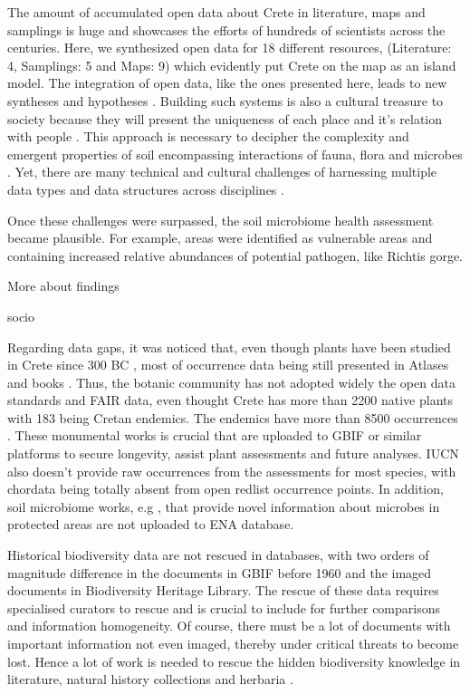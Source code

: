 \documentclass[a4paper,12pt]{article}
\begin{document}
The amount of accumulated open data about Crete in literature, maps and samplings is huge
and showcases the efforts of hundreds of scientists across the centuries.
Here, we synthesized open data for 18 different resources, (Literature: 4, Samplings: 5 and Maps: 9) 
which evidently put Crete on the map as an island model.
The integration of open data,
like the ones presented here, leads to new syntheses and hypotheses \parencite{ramirez2015toward,heberling_j_mason_data_2021}. 
Building such systems is also a cultural treasure to society because
they will present the uniqueness of each place and it's relation with 
people \parencite{bennett2022social}.
This approach is necessary to decipher the complexity and emergent properties of soil \parencite{jorna2024the-underground,philippot2024the-interplay}
encompassing interactions of fauna, flora and microbes \parencite{Fry2019, Crowther2019,GRANDY201640,Delgado-Baquerizo2020}.
Yet, there are many technical and cultural challenges of harnessing multiple data types and data structures across disciplines \parencite{Enquist_2024}.

Once these challenges were surpassed, the soil microbiome health assessment became plausible.
For example, areas were identified as vulnerable areas and containing increased relative
abundances of potential pathogen, like Richtis gorge.

More about findings


socio \parencite{nikolaidis2025an-integrated}

Regarding data gaps, it was noticed that, even though plants have been studied in
Crete since 300 BC \parencite{Krimbas_2005},
most of occurrence data being still presented in Atlases and books \parencite{dimopoulos2016,strid2024atlas,ralph1993flora}.
Thus, the botanic community has not adopted widely the open data standards and FAIR data,
even thought Crete has more than 2200 native plants with 183 being Cretan endemics. 
The endemics have more than 8500 occurrences \parencite{kougioumoutzis2020plant}.
These monumental works is crucial that are uploaded to GBIF or similar
platforms to secure longevity, assist plant assessments and future analyses.
IUCN also doesn't provide raw occurrences from the assessments for most species, 
with chordata being totally absent from open redlist occurrence points.
In addition, soil microbiome works, e.g \textcite{bekris2019do-genetic}, that 
provide novel information about microbes in protected areas are not 
uploaded to ENA database.

Historical biodiversity data are not rescued in databases,
with two orders of magnitude difference in the documents
in GBIF before 1960 and the imaged documents in Biodiversity Heritage Library.
The rescue of these data requires specialised curators to rescue and is crucial to include for 
further comparisons and information homogeneity. 
Of course, there must be 
a lot of documents with important information not even imaged, thereby under 
critical threats to become lost.
Hence a lot of work is needed to rescue the hidden biodiversity knowledge in
literature, natural history collections and herbaria \parencite{Paragkamian2022}.
\end{document}
